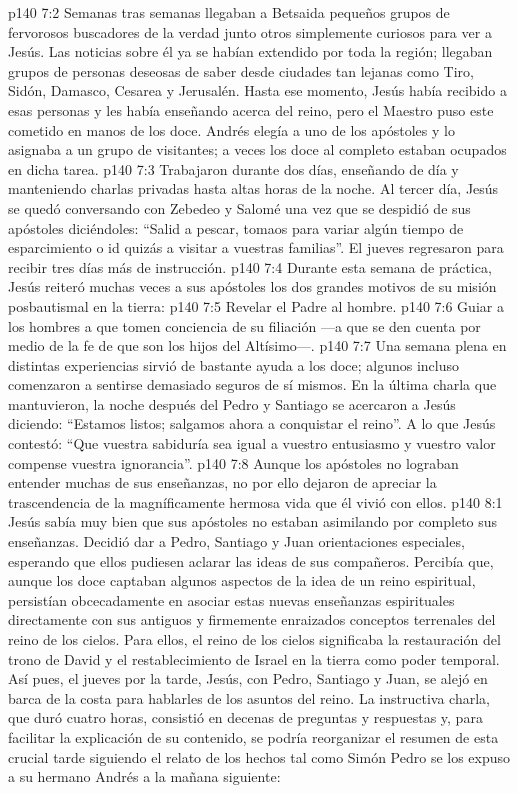\vs p140 7:2 \pc Semanas tras semanas llegaban a Betsaida pequeños grupos de fervorosos buscadores de la verdad junto otros simplemente curiosos para ver a Jesús. Las noticias sobre él ya se habían extendido por toda la región; llegaban grupos de personas deseosas de saber desde ciudades tan lejanas como Tiro, Sidón, Damasco, Cesarea y Jerusalén. Hasta ese momento, Jesús había recibido a esas personas y les había enseñando acerca del reino, pero el Maestro puso este cometido en manos de los doce. Andrés elegía a uno de los apóstoles y lo asignaba a un grupo de visitantes; a veces los doce al completo estaban ocupados en dicha tarea.
\vs p140 7:3 Trabajaron durante dos días, enseñando de día y manteniendo charlas privadas hasta altas horas de la noche. Al tercer día, Jesús se quedó conversando con Zebedeo y Salomé una vez que se despidió de sus apóstoles diciéndoles: “Salid a pescar, tomaos para variar algún tiempo de esparcimiento o id quizás a visitar a vuestras familias”. El jueves regresaron para recibir tres días más de instrucción.
\vs p140 7:4 Durante esta semana de práctica, Jesús reiteró muchas veces a sus apóstoles los dos grandes motivos de su misión posbautismal en la tierra:
\vs p140 7:5 Revelar el Padre al hombre.
\vs p140 7:6 Guiar a los hombres a que tomen conciencia de su filiación ---a que se den cuenta por medio de la fe de que son los hijos del Altísimo---.
\vs p140 7:7 \pc Una semana plena en distintas experiencias sirvió de bastante ayuda a los doce; algunos incluso comenzaron a sentirse demasiado seguros de sí mismos. En la última charla que mantuvieron, la noche después del  Pedro y Santiago se acercaron a Jesús diciendo: “Estamos listos; salgamos ahora a conquistar el reino”. A lo que Jesús contestó: “Que vuestra sabiduría sea igual a vuestro entusiasmo y vuestro valor compense vuestra ignorancia”.
\vs p140 7:8 Aunque los apóstoles no lograban entender muchas de sus enseñanzas, no por ello dejaron de apreciar la trascendencia de la magníficamente hermosa vida que él vivió con ellos.
\vs p140 8:1 Jesús sabía muy bien que sus apóstoles no estaban asimilando por completo sus enseñanzas. Decidió dar a Pedro, Santiago y Juan orientaciones especiales, esperando que ellos pudiesen aclarar las ideas de sus compañeros. Percibía que, aunque los doce captaban algunos aspectos de la idea de un reino espiritual, persistían obcecadamente en asociar estas nuevas enseñanzas espirituales directamente con sus antiguos y firmemente enraizados conceptos terrenales del reino de los cielos. Para ellos, el reino de los cielos significaba la restauración del trono de David y el restablecimiento de Israel en la tierra como poder temporal. Así pues, el jueves por la tarde, Jesús, con Pedro, Santiago y Juan, se alejó en barca de la costa para hablarles de los asuntos del reino. La instructiva charla, que duró cuatro horas, consistió en decenas de preguntas y respuestas y, para facilitar la explicación de su contenido, se podría reorganizar el resumen de esta crucial tarde siguiendo el relato de los hechos tal como Simón Pedro se los expuso a su hermano Andrés a la mañana siguiente:
